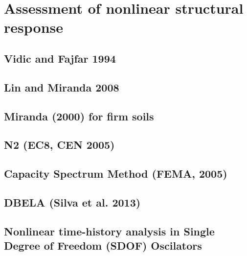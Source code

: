 	\section{Assessment of nonlinear structural response}
	\label{sec:nonlinear_response}
	
	
		\subsection{Vidic and Fajfar 1994}
		\label{subsec:VidicEtAl1994}
		
		
		\subsection{Lin and Miranda 2008}
		\label{subsec:LinMiranda2008}
		
	
		\subsection{Miranda (2000) for firm soils}
		\label{subsec:Miranda}
		
		
		\subsection{N2 (EC8, CEN 2005)}
		\label{subsec:N2}
		
	
		\subsection{Capacity Spectrum Method (FEMA, 2005)}
		\label{subsec:CSM}
		
		
		\subsection{DBELA (Silva et al. 2013)}
		\label{subsec:DBELA_Silva2013}
		
		
		\subsection{Nonlinear time-history analysis in Single Degree of Freedom (SDOF) Oscilators}
		\label{subsec:NLTHA_SDOF}
		
		
